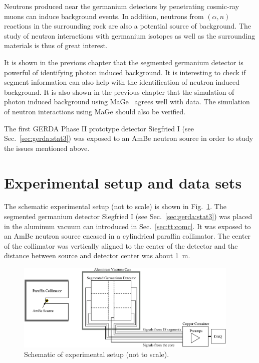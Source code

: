 Neutrons produced near the germanium detectors by penetrating cosmic-ray muons can induce background events. In addition, neutrons from $(\alpha, n)$ reactions in the surrounding rock are also a potential source of background. The study of neutron interactions with germanium isotopes as well as the surrounding materials is thus of great interest.

It is shown in the previous chapter that the segmented germanium detector is powerful of identifying photon induced background. It is interesting to check if segment information can also help with the identification of neutron induced background. It is also shown in the previous chapter that the simulation of photon induced background using MaGe~\cite{Mag06, Mag08} agrees well with data. The simulation of neutron interactions using MaGe should also be verified.

The first GERDA Phase II prototype detector Siegfried I (see Sec.~\ref{sec:gerda:stat3}) was exposed to an AmBe neutron source in order to study the issues mentioned above.

\section{Experimental setup and data sets}
\label{sec:neu:exp}
The schematic experimental setup (not to scale) is shown in Fig.~\ref{fig:neu:exp}. The segmented germanium detector Siegfried I (see Sec.~\ref{sec:gerda:stat3}) was placed in the aluminum vacuum can introduced in Sec.~\ref{sec:tt:comc}. It was exposed to an AmBe neutron source encased in a cylindrical paraffin collimator. The center of the collimator was vertically aligned to the center of the detector and the distance between source and detector center was about 1~m.

\begin{figure}[tbhp]
  \centering
  \includegraphics[width=0.95\textwidth]{neuExpSI}
  \caption{Schematic of experimental setup (not to scale).}
  \label{fig:neu:exp}
\end{figure}

